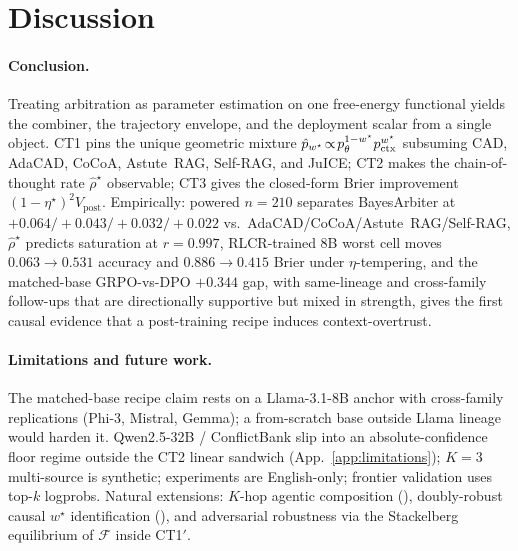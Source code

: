 \section{Discussion}
\label{sec:discussion}

\paragraph{Conclusion.}
Treating arbitration as parameter estimation on one free-energy functional yields the combiner, the trajectory envelope, and the deployment scalar from a single object. CT1 pins the unique geometric mixture $\hat p_{w^\star}\!\propto\!p_\theta^{1-w^\star}p_{\mathrm{ctx}}^{w^\star}$ subsuming CAD, AdaCAD, CoCoA, Astute~RAG, Self-RAG, and JuICE; CT2 makes the chain-of-thought rate $\widehat\rho^\star$ observable; CT3 gives the closed-form Brier improvement $(1\!-\!\eta^\star)^{2}V_{\mathrm{post}}$. Empirically: powered $n\!=\!210$ separates BayesArbiter at $+0.064/+0.043/+0.032/+0.022$ vs.\ AdaCAD/CoCoA/Astute~RAG/Self-RAG, $\widehat\rho^\star$ predicts saturation at $r\!=\!0.997$, RLCR-trained 8B worst cell moves $0.063\!\to\!0.531$ accuracy and $0.886\!\to\!0.415$ Brier under $\eta$-tempering, and the matched-base GRPO-vs-DPO $+0.344$ gap, with same-lineage and cross-family follow-ups that are directionally supportive but mixed in strength, gives the first causal evidence that a post-training recipe induces context-overtrust.

\paragraph{Limitations and future work.}
The matched-base recipe claim rests on a Llama-3.1-8B anchor with cross-family replications (Phi-3, Mistral, Gemma); a from-scratch base outside Llama lineage would harden it. Qwen2.5-32B / ConflictBank slip into an absolute-confidence floor regime outside the CT2 linear sandwich (App.~\ref{app:limitations}); $K\!=\!3$ multi-source is synthetic; experiments are English-only; frontier validation uses top-$k$ logprobs. Natural extensions: $K$-hop agentic composition (), doubly-robust causal $w^\star$ identification (), and adversarial robustness via the Stackelberg equilibrium of $\mathcal{F}$ inside CT1$'$.

